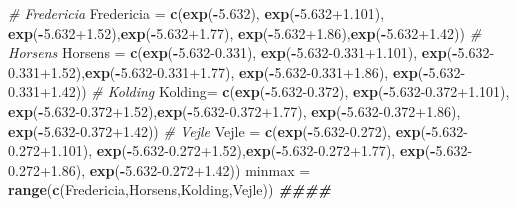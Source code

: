 \documentclass[
]{book}
\newenvironment{Shaded}{\begin{snugshade}}{\end{snugshade}}
\newcommand{\CommentTok}[1]{\textcolor[rgb]{0.56,0.35,0.01}{\textit{#1}}}
\newcommand{\DocumentationTok}[1]{\textcolor[rgb]{0.56,0.35,0.01}{\textbf{\textit{#1}}}}
\newcommand{\FloatTok}[1]{\textcolor[rgb]{0.00,0.00,0.81}{#1}}
\newcommand{\FunctionTok}[1]{\textcolor[rgb]{0.13,0.29,0.53}{\textbf{#1}}}
\newcommand{\NormalTok}[1]{#1}
\newcommand{\OtherTok}[1]{\textcolor[rgb]{0.56,0.35,0.01}{#1}}
\newcommand{\SpecialCharTok}[1]{\textcolor[rgb]{0.81,0.36,0.00}{\textbf{#1}}}
\begin{document}
\begin{Shaded}
\begin{Highlighting}[]
\CommentTok{\# Fredericia}
\NormalTok{Fredericia }\OtherTok{=} \FunctionTok{c}\NormalTok{(}\FunctionTok{exp}\NormalTok{(}\SpecialCharTok{{-}}\FloatTok{5.632}\NormalTok{), }\FunctionTok{exp}\NormalTok{(}\SpecialCharTok{{-}}\FloatTok{5.632+1.101}\NormalTok{),   }
               \FunctionTok{exp}\NormalTok{(}\SpecialCharTok{{-}}\FloatTok{5.632+1.52}\NormalTok{),}\FunctionTok{exp}\NormalTok{(}\SpecialCharTok{{-}}\FloatTok{5.632+1.77}\NormalTok{),}
               \FunctionTok{exp}\NormalTok{(}\SpecialCharTok{{-}}\FloatTok{5.632+1.86}\NormalTok{),}\FunctionTok{exp}\NormalTok{(}\SpecialCharTok{{-}}\FloatTok{5.632+1.42}\NormalTok{))}
\CommentTok{\# Horsens}
\NormalTok{Horsens }\OtherTok{=} \FunctionTok{c}\NormalTok{(}\FunctionTok{exp}\NormalTok{(}\SpecialCharTok{{-}}\FloatTok{5.632{-}0.331}\NormalTok{), }\FunctionTok{exp}\NormalTok{(}\SpecialCharTok{{-}}\FloatTok{5.632{-}0.331+1.101}\NormalTok{),   }
            \FunctionTok{exp}\NormalTok{(}\SpecialCharTok{{-}}\FloatTok{5.632{-}0.331+1.52}\NormalTok{),}\FunctionTok{exp}\NormalTok{(}\SpecialCharTok{{-}}\FloatTok{5.632{-}0.331+1.77}\NormalTok{),}
            \FunctionTok{exp}\NormalTok{(}\SpecialCharTok{{-}}\FloatTok{5.632{-}0.331+1.86}\NormalTok{),}
            \FunctionTok{exp}\NormalTok{(}\SpecialCharTok{{-}}\FloatTok{5.632{-}0.331+1.42}\NormalTok{))}
\CommentTok{\# Kolding}
\NormalTok{Kolding}\OtherTok{=} \FunctionTok{c}\NormalTok{(}\FunctionTok{exp}\NormalTok{(}\SpecialCharTok{{-}}\FloatTok{5.632{-}0.372}\NormalTok{), }\FunctionTok{exp}\NormalTok{(}\SpecialCharTok{{-}}\FloatTok{5.632{-}0.372+1.101}\NormalTok{),   }
           \FunctionTok{exp}\NormalTok{(}\SpecialCharTok{{-}}\FloatTok{5.632{-}0.372+1.52}\NormalTok{),}\FunctionTok{exp}\NormalTok{(}\SpecialCharTok{{-}}\FloatTok{5.632{-}0.372+1.77}\NormalTok{),}
           \FunctionTok{exp}\NormalTok{(}\SpecialCharTok{{-}}\FloatTok{5.632{-}0.372+1.86}\NormalTok{), }\FunctionTok{exp}\NormalTok{(}\SpecialCharTok{{-}}\FloatTok{5.632{-}0.372+1.42}\NormalTok{))}
\CommentTok{\# Vejle}
\NormalTok{Vejle }\OtherTok{=} \FunctionTok{c}\NormalTok{(}\FunctionTok{exp}\NormalTok{(}\SpecialCharTok{{-}}\FloatTok{5.632{-}0.272}\NormalTok{), }\FunctionTok{exp}\NormalTok{(}\SpecialCharTok{{-}}\FloatTok{5.632{-}0.272+1.101}\NormalTok{),   }
          \FunctionTok{exp}\NormalTok{(}\SpecialCharTok{{-}}\FloatTok{5.632{-}0.272+1.52}\NormalTok{),}\FunctionTok{exp}\NormalTok{(}\SpecialCharTok{{-}}\FloatTok{5.632{-}0.272+1.77}\NormalTok{),}
          \FunctionTok{exp}\NormalTok{(}\SpecialCharTok{{-}}\FloatTok{5.632{-}0.272+1.86}\NormalTok{), }\FunctionTok{exp}\NormalTok{(}\SpecialCharTok{{-}}\FloatTok{5.632{-}0.272+1.42}\NormalTok{))}
\NormalTok{minmax }\OtherTok{=} \FunctionTok{range}\NormalTok{(}\FunctionTok{c}\NormalTok{(Fredericia,Horsens,Kolding,Vejle))}
\DocumentationTok{\#\#\#\#}
\end{Highlighting}
\end{Shaded}
\end{document}
